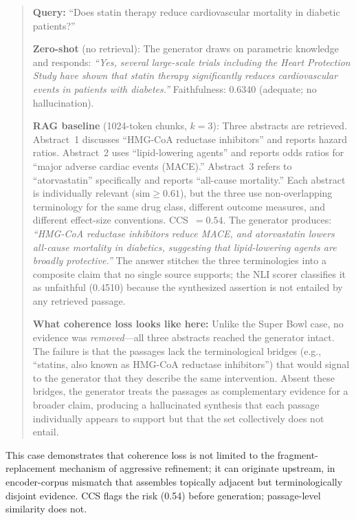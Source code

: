 \begin{quote}
\small
\textbf{Query:} ``Does statin therapy reduce cardiovascular mortality in
diabetic patients?''

\textbf{Zero-shot} (no retrieval): The generator draws on parametric
knowledge and responds: \emph{``Yes, several large-scale trials including
the Heart Protection Study have shown that statin therapy significantly
reduces cardiovascular events in patients with diabetes.''} Faithfulness:
0.6340 (adequate; no hallucination).

\textbf{RAG baseline} (1024-token chunks, $k=3$): Three abstracts are
retrieved. Abstract~1 discusses ``HMG-CoA reductase inhibitors'' and
reports hazard ratios. Abstract~2 uses ``lipid-lowering agents'' and
reports odds ratios for ``major adverse cardiac events (MACE).''
Abstract~3 refers to ``atorvastatin'' specifically and reports
``all-cause mortality.'' Each abstract is individually relevant
($\text{sim} \geq 0.61$), but the three use non-overlapping terminology
for the same drug class, different outcome measures, and different
effect-size conventions. CCS~$= 0.54$. The generator produces:
\emph{``HMG-CoA reductase inhibitors reduce MACE, and atorvastatin
lowers all-cause mortality in diabetics, suggesting that lipid-lowering
agents are broadly protective.''} The answer stitches the three
terminologies into a composite claim that no single source supports;
the NLI scorer classifies it as unfaithful (0.4510) because the
synthesized assertion is not entailed by any retrieved passage.

\textbf{What coherence loss looks like here:} Unlike the Super Bowl case,
no evidence was \emph{removed}---all three abstracts reached the
generator intact. The failure is that the passages lack the
terminological bridges (e.g., ``statins, also known as HMG-CoA reductase
inhibitors'') that would signal to the generator that they describe the
same intervention. Absent these bridges, the generator treats the
passages as complementary evidence for a broader claim, producing a
hallucinated synthesis that each passage individually appears to support
but that the set collectively does not entail.
\end{quote}

\noindent This case demonstrates that coherence loss is not limited to the
fragment-replacement mechanism of aggressive refinement; it can originate
upstream, in encoder-corpus mismatch that assembles topically adjacent but
terminologically disjoint evidence. CCS flags the risk (0.54) before
generation; passage-level similarity does not.

